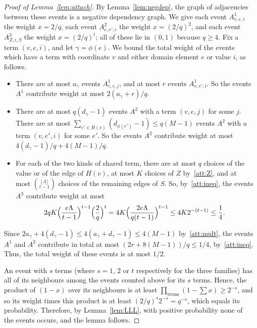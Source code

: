 \begin{proof}[Proof of Lemma~\ref{lem:attach}]
By Lemma~\ref{lem:negdep}, the graph of adjacencies between these events is a negative dependency graph.
We give each event $A^1_{v,e,i}$ the weight $x=2/q$, each event $A^2_{e,e',i}$ the weight $x=(2/q)^2$, and each event $A^3_{Z,i,S}$ the weight $x=(2/q)^t$; all of these lie in $(0,1)$ because $q\ge4$.
Fix a term $(v,e,i)$, and let $\gamma=\phi(e)$. We bound the total weight of the events which have a term with coordinate $v$ and either domain element $e$ or value $i$, as follows.
\begin{itemize}
\item There are at most $a_\gamma$ events $A^1_{v,e,j}$, and at most $r$ events $A^1_{v,e',i}$. So the events $A^1$ contribute weight at most $2(a_\gamma+r)/q$.
\item There are at most $q(d_\gamma-1)$ events $A^2$ with a term $(v,e,j)$ for some $j$. There are at most $\sum_{e'\in H(v)}(d_{\phi(e')}-1)\le q(M-1)$ events $A^2$ with a term $(v,e',i)$ for some $e'$. So the events $A^2$ contribute weight at most $4(d_\gamma-1)/q+4(M-1)/q$.
\item For each of the two kinds of shared term, there are at most $q$ choices of the value or of the edge of $H(v)$, at most $K$ choices of $Z$ by~\ref{att:Z}, and at most $\binom{\lfloor\Lambda\rfloor}{t-1}$ choices of the remaining edges of $S$. So, by~\ref{att:ineq}, the events $A^3$ contribute weight at most
\[
2qK\Bigl(\frac{e\Lambda}{t-1}\Bigr)^{t-1}\Bigl(\frac 2q\Bigr)^t=4K\Bigl(\frac{2e\Lambda}{q(t-1)}\Bigr)^{t-1}\le4K2^{-(t-1)}\le\frac14.
\]
\end{itemize}
Since $2a_\gamma+4(d_\gamma-1)\le4(a_\gamma+d_\gamma-1)\le4(M-1)$ by~\ref{att:mult}, the events $A^1$ and $A^2$ contribute in total at most $(2r+8(M-1))/q\le 1/4$, by~\ref{att:ineq}. Thus, the total weight of these events is at most $1/2$.

An event with $s$ terms (where $s=1$, $2$ or $t$ respectively for the three families) has all of its neighbours among the events counted above for its $s$ terms. Hence, the product of $(1-x)$ over its neighbours is at least $\prod_{\text{terms}}(1-\sum x)\ge2^{-s}$, and so its weight times this product is at least $(2/q)^s2^{-s}=q^{-s}$, which equals its probability.
Therefore, by Lemma~\ref{lem:LLL}, with positive probability none of the events occurs, and the lemma follows.
\end{proof}
